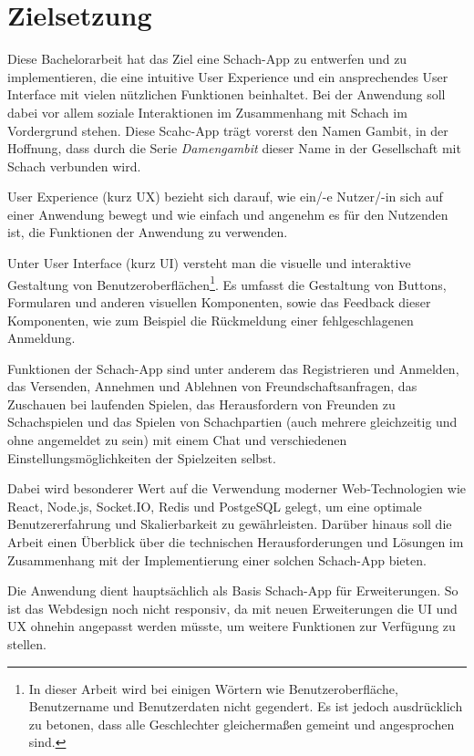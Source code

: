     \section{Zielsetzung}
    \label{sec:Zielsetzung}
    Diese Bachelorarbeit hat das Ziel eine Schach-App zu entwerfen und zu implementieren, die eine intuitive User Experience und ein ansprechendes User Interface mit vielen nützlichen Funktionen beinhaltet. Bei der Anwendung soll dabei vor allem soziale Interaktionen im Zusammenhang mit Schach im Vordergrund stehen. Diese Scahc-App trägt vorerst den Namen \glqq Gambit\grqq , in der Hoffnung, dass durch die Serie \textit{Damengambit} dieser Name in der Gesellschaft mit Schach verbunden wird.
    
User Experience (kurz UX) bezieht sich darauf, wie ein/-e Nutzer/-in sich auf einer Anwendung bewegt und wie einfach und angenehm es für den Nutzenden ist, die Funktionen der Anwendung zu verwenden.
    
    Unter User Interface (kurz UI) versteht man die visuelle und interaktive Gestaltung von Benutzeroberflächen\footnote{In dieser Arbeit wird bei einigen Wörtern wie Benutzeroberfläche, Benutzername und Benutzerdaten nicht gegendert. Es ist jedoch ausdrücklich zu betonen, dass alle Geschlechter gleichermaßen gemeint und angesprochen sind.}. Es umfasst die Gestaltung von Buttons, Formularen und anderen visuellen Komponenten, sowie das Feedback dieser Komponenten, wie zum Beispiel die Rückmeldung einer fehlgeschlagenen Anmeldung.\cite{webdesign}
        
        Funktionen der Schach-App sind unter anderem das Registrieren und Anmelden, das Versenden, Annehmen und Ablehnen von Freundschaftsanfragen, das Zuschauen bei laufenden Spielen, das Herausfordern von Freunden zu Schachspielen und das Spielen von Schachpartien (auch mehrere gleichzeitig und ohne angemeldet zu sein) mit einem Chat und verschiedenen Einstellungsmöglichkeiten der Spielzeiten selbst. 
        
    Dabei wird besonderer Wert auf die Verwendung moderner Web-Technologien wie React, Node.js, Socket.IO, Redis und PostgeSQL gelegt, um eine optimale Benutzererfahrung und Skalierbarkeit zu gewährleisten. Darüber hinaus soll die Arbeit einen Überblick über die technischen Herausforderungen und Lösungen im Zusammenhang mit der Implementierung einer solchen Schach-App bieten.
    
Die Anwendung dient hauptsächlich als Basis Schach-App für Erweiterungen. So ist das Webdesign noch nicht responsiv, da mit neuen Erweiterungen die UI und UX ohnehin angepasst werden müsste, um weitere Funktionen zur Verfügung zu stellen.

